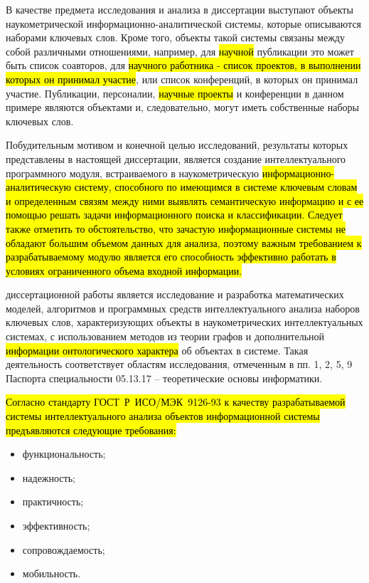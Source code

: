 
{\actuality} В качестве предмета исследования и анализа в диссертации выступают объекты наукометрической информационно-аналитической системы, которые описываются наборами ключевых слов. Кроме того, объекты такой системы связаны между собой различными отношениями, например, для \hl{научной} публикации это может быть список соавторов, для \hl{научного работника - список проектов, в выполнении которых он принимал участие}, или список конференций, в которых он принимал участие. Публикации, персоналии, \hl{научные проекты} и конференции в данном примере являются объектами и, следовательно, могут иметь собственные наборы ключевых слов. 

Побудительным мотивом и конечной целью исследований, результаты которых представлены в настоящей диссертации, является создание интеллектуального программного модуля, встраиваемого в наукометрическую \hl{информационно-аналитическую систему, способного по имеющимся в системе ключевым словам и определенным связям между ними выявлять семантическую информацию и с ее помощью решать задачи информационного поиска и классификации. Следует также отметить то обстоятельство, что зачастую информационные системы не обладают большим объемом данных для анализа, поэтому важным требованием к разрабатываемому модулю является его способность эффективно работать в условиях ограниченного объема входной информации.}

{\aim}  диссертационной работы является исследование и разработка математических моделей, алгоритмов и программных средств интеллектуального анализа наборов ключевых слов, характеризующих объекты в наукометрических интеллектуальных системах, с использованием методов из теории графов и дополнительной \hl{информации онтологического характера} об объектах в системе. Такая деятельность соответствует областям исследования, отмеченным в пп. 1, 2, 5, 9 Паспорта специальности 05.13.17 – теоретические основы информатики.

{\workrequirements}
\hl{Согласно стандарту \mbox{ГОСТ Р ИСО/МЭК 9126-93} к качеству разрабатываемой системы интеллектуального анализа объектов информационной системы предъявляются следующие требования:}
\begin{itemize}
    \item функциональность; 
    \item надежность;
    \item практичность;
    \item эффективность;
    \item сопровождаемость;
    \item мобильность.
\end{itemize}

